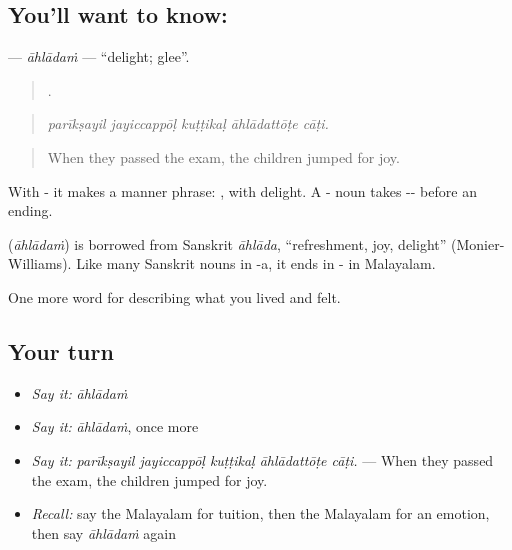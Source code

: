 \subsection*{You'll want to know: }
\textbf{} — \emph{āhlādaṁ} — \textquotedblleft{}delight; glee\textquotedblright{}.

\begin{quote}
    .
\end{quote}

\begin{quote}
\emph{parīkṣayil jayiccappōḷ kuṭṭikaḷ āhlādattōṭe cāṭi.}
\end{quote}

\begin{quote}
When they passed the exam, the children jumped for joy.
\end{quote}

With - it makes a manner phrase: , with delight. A - noun takes -- before an ending.

\begin{cousinweb}
\textbf{} (\emph{āhlādaṁ}) is borrowed from Sanskrit \emph{āhlāda}, \textquotedblleft{}refreshment, joy, delight\textquotedblright{} (Monier-Williams). Like many Sanskrit nouns in -a, it ends in - in Malayalam.
\end{cousinweb}

\begin{grammarlens}[title={What you've built}]
One more word for describing what you lived and felt.
\end{grammarlens}

\subsection*{Your turn}
\begin{itemize}
\raggedright
  \item \emph{Say it:} \emph{āhlādaṁ}
  \item \emph{Say it:} \emph{āhlādaṁ}, once more
  \item \emph{Say it:} \emph{parīkṣayil jayiccappōḷ kuṭṭikaḷ āhlādattōṭe cāṭi.} — When they passed the exam, the children jumped for joy.
  \item \emph{Recall:} say the Malayalam for tuition, then the Malayalam for an emotion, then say \emph{āhlādaṁ} again
\end{itemize}

